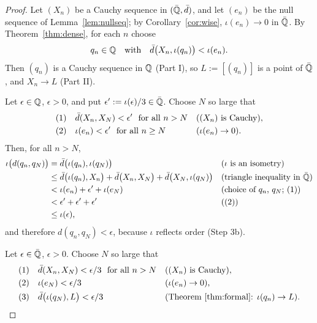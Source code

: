 \begin{proof}
Let $(X_n)$ be a Cauchy sequence in $(\bar{\mathbb{Q}},\bar{d})$, and let $(e_n)$ be the null
sequence of Lemma~\ref{lem:nullseq}; by Corollary~\ref{cor:wise},
$\iota(e_n)\to0$ in $\bar{\mathbb{Q}}$. By Theorem~\ref{thm:dense}, for each $n$ choose
\[
q_n\in\mathbb{Q} \quad\text{with}\quad \bar{d}\big(X_n,\iota(q_n)\big)<\iota(e_n) .
\]
Then $(q_n)$ is a Cauchy sequence in $\mathbb{Q}$ (Part I), so $L:=[(q_n)]$ is a point
of $\bar{\mathbb{Q}}$, and $X_n\to L$ (Part II).

Let $\epsilon\in\mathbb{Q}$, $\epsilon>0$, and put $\epsilon':=\iota(\epsilon)/3\in\bar{\mathbb{Q}}$.
Choose $N$ so large that
\begin{align*}
&(1)\quad \bar{d}(X_n,X_N)<\epsilon' \ \text{ for all } n>N
&&\text{($(X_n)$ is Cauchy)},\\
&(2)\quad \iota(e_n)<\epsilon' \ \text{ for all } n\ge N
&&\text{($\iota(e_n)\to0$)}.
\end{align*}
Then, for all $n>N$,
\begin{align*}
\iota\big(d(q_n,q_N)\big)
&= \bar{d}\big(\iota(q_n),\iota(q_N)\big)
&&\text{($\iota$ is an isometry)}\\
&\le \bar{d}\big(\iota(q_n),X_n\big)+\bar{d}\big(X_n,X_N\big)+\bar{d}\big(X_N,\iota(q_N)\big)
&&\text{(triangle inequality in $\bar{\mathbb{Q}}$)}\\
&< \iota(e_n)+\epsilon'+\iota(e_N)
&&\text{(choice of $q_n$, $q_N$; (1))}\\
&< \epsilon'+\epsilon'+\epsilon'
&&\text{((2))}\\
&\le \iota(\epsilon) ,
\end{align*}
and therefore $d(q_n,q_N)<\epsilon$, because $\iota$ reflects order (Step 3b).

Let $\epsilon\in\bar{\mathbb{Q}}$, $\epsilon>0$. Choose $N$ so large that
\begin{align*}
&(1)\quad \bar{d}(X_n,X_N)<\epsilon/3 \ \text{ for all } n>N
&&\text{($(X_n)$ is Cauchy)},\\
&(2)\quad \iota(e_N)<\epsilon/3
&&\text{($\iota(e_n)\to0$)},\\
&(3)\quad \bar{d}\big(\iota(q_N),L\big)<\epsilon/3
&&\text{(Theorem~\ref{thm:formal}: $\iota(q_n)\to L$)}.
\end{align*}


\noindent
{}
\end{proof}
